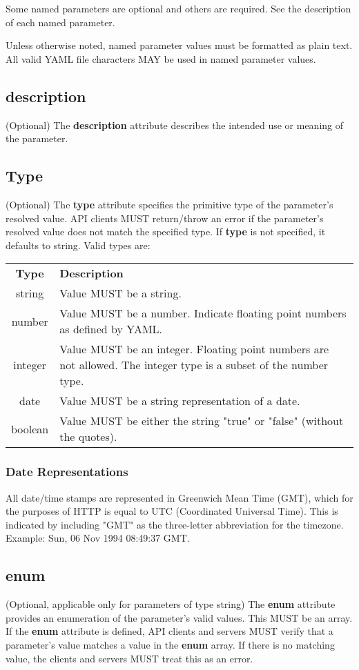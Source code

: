 Some named parameters are optional and others are required. See the description of each named parameter.

Unless otherwise noted, named parameter values must be formatted as plain text. All valid YAML file characters MAY be used in named parameter values.

\subsection{description}
(Optional)
The \textbf{description} attribute describes the intended use or meaning of the parameter.

\subsection{Type}
(Optional)
The \textbf{type} attribute specifies the primitive type of the parameter's resolved value. API clients MUST return/throw an error if the parameter's resolved value does not match the specified type. If \textbf{type} is not specified, it defaults to string. Valid types are:

\begin{tabularx}{\textwidth}{c | X}
\textbf{Type} &  \textbf{Description} \\
string  & Value MUST be a string. \\
number  & Value MUST be a number. Indicate floating point numbers as defined by YAML. \\
integer & Value MUST be an integer. Floating point numbers are not allowed. The integer type is a subset of the number type. \\
date    & Value MUST be a string representation of a date.\\
boolean & Value MUST be either the string "true" or "false" (without the quotes). \\
\end{tabularx}

\subsubsection{Date Representations}
All date/time stamps are represented in Greenwich Mean Time (GMT), which for the purposes of HTTP is equal to UTC (Coordinated Universal Time). This is indicated by including "GMT" as the three-letter abbreviation for the timezone. Example: Sun, 06 Nov 1994 08:49:37 GMT.


\subsection{enum}
(Optional, applicable only for parameters of type string)
The \textbf{enum} attribute provides an enumeration of the parameter's valid values. This MUST be an array. If the \textbf{enum} attribute is defined, API clients and servers MUST verify that a parameter's value matches a value in the \textbf{enum} array. If there is no matching value, the clients and servers MUST treat this as an error.

